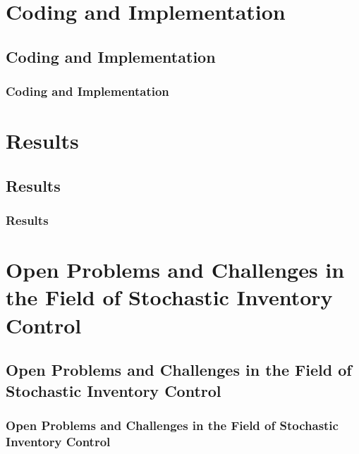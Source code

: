 \documentclass{beamer}
\begin{document}
  \section{Coding and Implementation}
    \subsection{Coding and Implementation}
    \begin{frame}
    \frametitle{Coding and Implementation}

    \end{frame}
  \section{Results}
    \subsection{Results}
    \begin{frame}

    \frametitle{Results}

    \end{frame}
  \section{Open Problems and Challenges in the Field of Stochastic Inventory Control}
    \subsection{Open Problems and Challenges in the Field of Stochastic Inventory Control}
    \begin{frame}
    \frametitle{Open Problems and Challenges in the Field of Stochastic Inventory Control}

    \end{frame}
\end{document}
